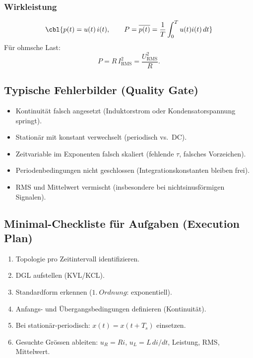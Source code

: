 \subsubsection{Wirkleistung}
\[
\cbl{p(t)=u(t)\,i(t),\qquad P=\overline{p(t)}=\frac{1}{T}\int_0^T u(t)i(t)\,dt}
\]
Für ohmsche Last:
\[
P=R\,I_{\mathrm{RMS}}^2=\frac{U_{\mathrm{RMS}}^2}{R}.
\]

\subsection{Typische Fehlerbilder (Quality Gate)}


\begin{itemize}
    \item Kontinuität falsch angesetzt (Induktorstrom oder Kondensatorspannung springt).
    \item Stationär mit konstant verwechselt (periodisch vs.\ DC).
    \item Zeitvariable im Exponenten falsch skaliert (fehlende $\tau$, falsches Vorzeichen).
    \item Periodenbedingungen nicht geschlossen (Integrationskonstanten bleiben frei).
    \item RMS und Mittelwert vermischt (insbesondere bei nichtsinusförmigen Signalen).
\end{itemize}

\subsection{Minimal-Checkliste für Aufgaben (Execution Plan)}
\begin{enumerate}
    \item Topologie pro Zeitintervall identifizieren.
    \item DGL aufstellen (KVL/KCL).
    \item Standardform erkennen ($1.\ Ordnung$: exponentiell).
    \item Anfangs- und Übergangsbedingungen definieren (Kontinuität).
    \item Bei stationär-periodisch: $x(t)=x(t+T_s)$ einsetzen.
    \item Gesuchte Grössen ableiten: $u_R=Ri$, $u_L=L\,di/dt$, Leistung, RMS, Mittelwert.
\end{enumerate}
